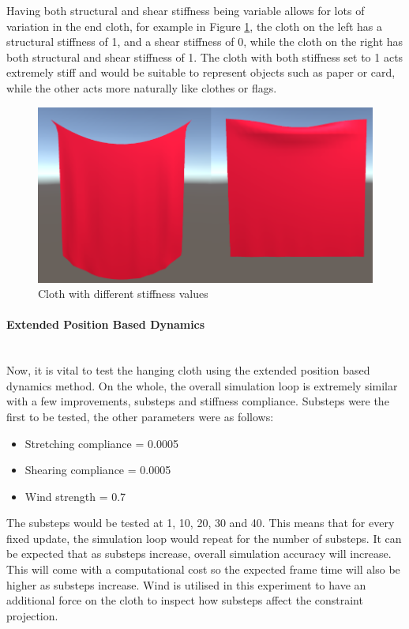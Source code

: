 \documentclass[12pt,a4paper]{article}
\begin{document}
Having both structural and shear stiffness being variable allows for lots of variation in the end cloth, for example in Figure \ref{fig:pbdcomp}, the cloth on the left has a structural stiffness of 1, and a shear stiffness of 0, while the cloth on the right has both structural and shear stiffness of 1. The cloth with both stiffness set to 1 acts extremely stiff and would be suitable to represent objects such as paper or card, while the other acts more naturally like clothes or flags.
\begin{figure}
	\centering
	\includegraphics[scale=0.5]{pbdcomp.png}
	\caption{Cloth with different stiffness values}
	\label{fig:pbdcomp}
\end{figure}
\paragraph{Extended Position Based Dynamics} \mbox{} \\
Now, it is vital to test the hanging cloth using the extended position based dynamics method. On the whole, the overall simulation loop is extremely similar with a few improvements, substeps and stiffness compliance. Substeps were the first to be tested, the other parameters were as follows:  
\begin{itemize}
	\item Stretching compliance = 0.0005
	\item Shearing compliance = 0.0005
	\item Wind strength = 0.7
\end{itemize}
The substeps would be tested at 1, 10, 20, 30 and 40. This means that for every fixed update, the simulation loop would repeat for the number of substeps. It can be expected that as substeps increase, overall simulation accuracy will increase. This will come with a computational cost so the expected frame time will also be higher as substeps increase. Wind is utilised in this experiment to have an additional force on the cloth to inspect how substeps affect the constraint projection. \\
\end{document}
